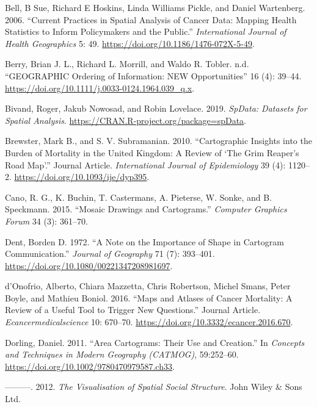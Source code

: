 \documentclass[11pt,]{article}
\begin{document}
\leavevmode\hypertarget{ref-CPISACA}{}%
Bell, B Sue, Richard E Hoskins, Linda Williams Pickle, and Daniel
Wartenberg. 2006. ``Current Practices in Spatial Analysis of Cancer
Data: Mapping Health Statistics to Inform Policymakers and the Public.''
\emph{International Journal of Health Geographics} 5: 49.
\url{https://doi.org/10.1186/1476-072X-5-49}.

\leavevmode\hypertarget{ref-GOINO}{}%
Berry, Brian J. L., Richard L. Morrill, and Waldo R. Tobler. n.d.
``GEOGRAPHIC Ordering of Information: NEW Opportunities'' 16 (4):
39--44. \url{https://doi.org/10.1111/j.0033-0124.1964.039_q.x}.

\leavevmode\hypertarget{ref-spData}{}%
Bivand, Roger, Jakub Nowosad, and Robin Lovelace. 2019. \emph{SpData:
Datasets for Spatial Analysis}.
\url{https://CRAN.R-project.org/package=spData}.

\leavevmode\hypertarget{ref-CIBMUK}{}%
Brewster, Mark B., and S. V. Subramanian. 2010. ``Cartographic Insights
into the Burden of Mortality in the United Kingdom: A Review of `The
Grim Reaper's Road Map'.'' Journal Article. \emph{International Journal
of Epidemiology} 39 (4): 1120--2.
\url{https://doi.org/10.1093/ije/dyp395}.

\leavevmode\hypertarget{ref-MDAC}{}%
Cano, R. G., K. Buchin, T. Castermans, A. Pieterse, W. Sonke, and B.
Speckmann. 2015. ``Mosaic Drawings and Cartograms.'' \emph{Computer
Graphics Forum} 34 (3): 361--70.

\leavevmode\hypertarget{ref-NISCC}{}%
Dent, Borden D. 1972. ``A Note on the Importance of Shape in Cartogram
Communication.'' \emph{Journal of Geography} 71 (7): 393--401.
\url{https://doi.org/10.1080/00221347208981697}.

\leavevmode\hypertarget{ref-MACM}{}%
d'Onofrio, Alberto, Chiara Mazzetta, Chris Robertson, Michel Smans,
Peter Boyle, and Mathieu Boniol. 2016. ``Maps and Atlases of Cancer
Mortality: A Review of a Useful Tool to Trigger New Questions.'' Journal
Article. \emph{Ecancermedicalscience} 10: 670--70.
\url{https://doi.org/10.3332/ecancer.2016.670}.

\leavevmode\hypertarget{ref-ACTUC}{}%
Dorling, Daniel. 2011. ``Area Cartograms: Their Use and Creation.'' In
\emph{Concepts and Techniques in Modern Geography (CATMOG)}, 59:252--60.
\url{https://doi.org/10.1002/9780470979587.ch33}.

\leavevmode\hypertarget{ref-TVSSS}{}%
---------. 2012. \emph{The Visualisation of Spatial Social Structure}.
John Wiley \& Sons Ltd.
\end{document}
